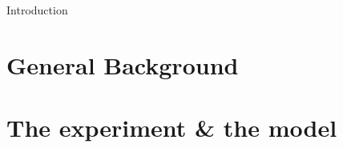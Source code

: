 

Introduction   

\section{General Background}


\section{The experiment & the model}
\label{sec:general_overview}


